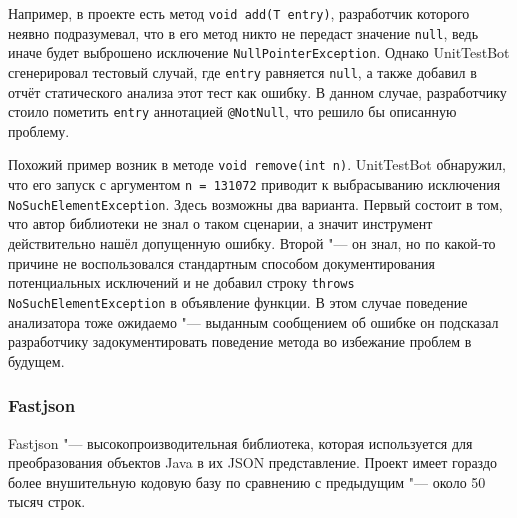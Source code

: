 Например, в проекте есть метод \verb|void add(T entry)|, разработчик которого неявно подразумевал, что в его метод никто не передаст значение \verb|null|, ведь иначе будет выброшено исключение \verb|NullPointerException|. Однако UnitTestBot сгенерировал тестовый случай, где \verb|entry| равняется \verb|null|, а также добавил в отчёт статического анализа этот тест как ошибку. В данном случае, разработчику стоило пометить \verb|entry| аннотацией \verb|@NotNull|, что решило бы описанную проблему.

Похожий пример возник в методе \verb|void remove(int n)|. UnitTestBot обнаружил, что его запуск с аргументом \verb|n = 131072| приводит к выбрасыванию исключения \verb|NoSuchElementException|. Здесь возможны два варианта. Первый состоит в том, что автор библиотеки не знал о таком сценарии, а значит инструмент действительно нашёл допущенную ошибку. Второй "--- он знал, но по какой-то причине не воспользовался стандартным способом документирования потенциальных исключений и не добавил строку \verb|throws NoSuchElementException| в объявление функции. В этом случае поведение анализатора тоже ожидаемо "--- выданным сообщением об ошибке он подсказал разработчику задокументировать поведение метода во избежание проблем в будущем.




\subsubsection{Fastjson}

Fastjson \cite{fastjson} "--- высокопроизводительная библиотека, которая используется для преобразования объектов Java в их JSON представление. Проект имеет гораздо более внушительную кодовую базу по сравнению с предыдущим "--- около 50 тысяч строк.


